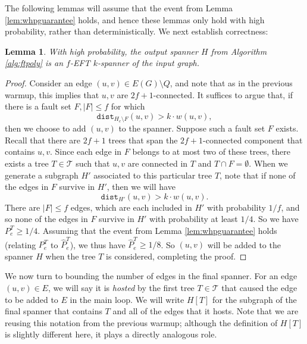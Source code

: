 \documentclass{article}
\theoremstyle{plain}
\newtheorem{lemma}[theorem]{Lemma}
\theoremstyle{definition}
\newcommand{\dist}{\texttt{dist}}
\newcommand{\tee}{\mathcal{T}}
\begin{document}
The following lemmas will assume that the event from Lemma \ref{lem:whpguarantee} holds, and hence these lemmas only hold with high probability, rather than deterministically.
We next establish correctness:
\begin{lemma} \label{lem:poly-correct}
With high probability, the output spanner $H$ from Algorithm \ref{alg:ftpoly} is an $f$-EFT $k$-spanner of the input graph.
\end{lemma}
\begin{proof}
Consider an edge $(u, v) \in E(G) \setminus Q$, and note that as in the previous warmup, this implies that $u, v$ are $2f+1$-connected.
It suffices to argue that, if there is a fault set $F, |F| \le f$ for which 
$$\dist_{H_e \setminus F}(u, v) > k \cdot w(u, v),$$
then we choose to add $(u, v)$ to the spanner.
Suppose such a fault set $F$ exists.
Recall that there are $2f+1$ trees that span the $2f+1$-connected component that contains $u, v$.
Since each edge in $F$ belongs to at most two of these trees, there exists a tree $T \in \mathcal{T}$ such that $u, v$ are connected in $T$ and $T \cap F = \emptyset$.
When we generate a subgraph $H'$ associated to this particular tree $T$, note that if none of the edges in $F$ survive in $H'$, then we will have
$$\dist_{H'}(u, v) > k \cdot w(u, v).$$
There are $|F|\le f$ edges, which are each included in $H'$ with probability $1/f$, and so none of the edges in $F$ survive in $H'$ with probability at least $1/4$.
So we have $P_e^T \ge 1/4$.
Assuming that the event from Lemma \ref{lem:whpguarantee} holds (relating $P^T_e$ to $\widehat{P}_e^T$), we thus have $\widehat{P}_e^T \ge 1/8$.
So $(u, v)$ will be added to the spanner $H$ when the tree $T$ is considered, completing the proof.
\end{proof}

We now turn to bounding the number of edges in the final spanner.
For an edge $(u, v) \in E$, we will say it is \emph{hosted} by the first tree $T \in \tee$ that caused the edge to be added to $E$ in the main loop.
We will write $H[T]$ for the subgraph of the final spanner that contains $T$ and all of the edges that it hosts.
Note that we are reusing this notation from the previous warmup; although the definition of $H[T]$ is slightly different here, it plays a directly analogous role.
\end{document}
